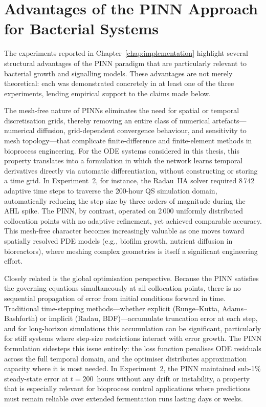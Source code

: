 \documentclass[14pt,a4paper,openany]{extbook}
\begin{document}
\section{Advantages of the PINN Approach for Bacterial Systems}
\label{sec:advantages}

The experiments reported in Chapter~\ref{chap:implementation} highlight several structural advantages of the PINN paradigm that are particularly relevant to bacterial growth and signalling models. These advantages are not merely theoretical: each was demonstrated concretely in at least one of the three experiments, lending empirical support to the claims made below.

The mesh-free nature of PINNs eliminates the need for spatial or temporal discretisation grids, thereby removing an entire class of numerical artefacts---numerical diffusion, grid-dependent convergence behaviour, and sensitivity to mesh topology---that complicate finite-difference and finite-element methods in bioprocess engineering. For the ODE systems considered in this thesis, this property translates into a formulation in which the network learns temporal derivatives directly via automatic differentiation, without constructing or storing a time grid. In Experiment~2, for instance, the Radau~IIA solver required 8\,742 adaptive time steps to traverse the 200-hour QS simulation domain, automatically reducing the step size by three orders of magnitude during the AHL spike. The PINN, by contrast, operated on 2\,000 uniformly distributed collocation points with no adaptive refinement, yet achieved comparable accuracy. This mesh-free character becomes increasingly valuable as one moves toward spatially resolved PDE models (e.g., biofilm growth, nutrient diffusion in bioreactors), where meshing complex geometries is itself a significant engineering effort.

Closely related is the global optimisation perspective. Because the PINN satisfies the governing equations simultaneously at all collocation points, there is no sequential propagation of error from initial conditions forward in time. Traditional time-stepping methods---whether explicit (Runge--Kutta, Adams--Bashforth) or implicit (Radau, BDF)---accumulate truncation error at each step, and for long-horizon simulations this accumulation can be significant, particularly for stiff systems where step-size restrictions interact with error growth. The PINN formulation sidesteps this issue entirely: the loss function penalises ODE residuals across the full temporal domain, and the optimiser distributes approximation capacity where it is most needed. In Experiment~2, the PINN maintained sub-1\% steady-state error at $t = 200$~hours without any drift or instability, a property that is especially relevant for bioprocess control applications where predictions must remain reliable over extended fermentation runs lasting days or weeks.
\end{document}
